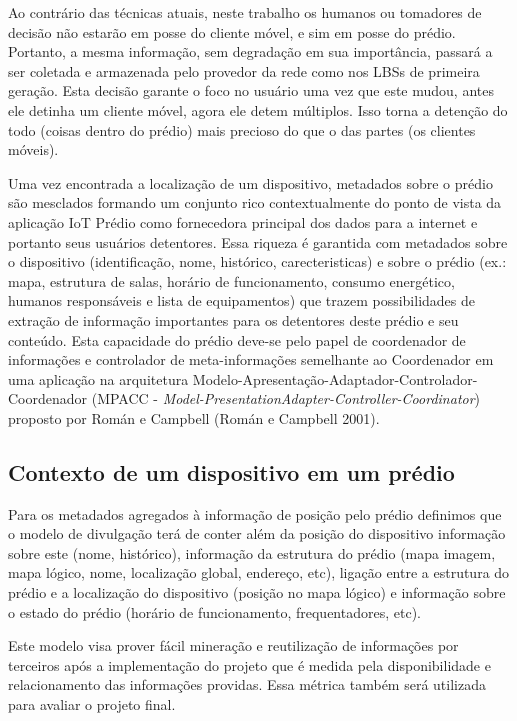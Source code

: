 Ao contrário das técnicas atuais, neste trabalho os humanos ou tomadores de decisão não estarão em posse do cliente móvel, e sim em posse do prédio. Portanto, a mesma informação, sem degradação em sua importância, passará a ser coletada e armazenada pelo provedor da rede como nos LBSs de primeira geração. Esta decisão garante o foco no usuário uma vez que este mudou, antes ele detinha um cliente móvel, agora ele detem múltiplos. Isso torna a detenção do todo (coisas dentro do prédio) mais precioso do que o das partes (os clientes móveis).

Uma vez encontrada a localização de um dispositivo, metadados sobre o prédio são mesclados formando um conjunto rico contextualmente do ponto de vista da aplicação IoT Prédio como fornecedora principal dos dados para a internet e portanto seus usuários detentores. Essa riqueza é garantida com metadados sobre o dispositivo (identificação, nome, histórico, carecteristicas) e sobre o prédio (ex.: mapa, estrutura de salas, horário de funcionamento, consumo energético, humanos responsáveis e lista de equipamentos) que trazem possibilidades de extração de informação importantes para os detentores deste prédio e seu conteúdo. Esta capacidade do prédio deve-se pelo papel de coordenador de informações e controlador de meta-informações semelhante ao Coordenador em uma aplicação na arquitetura Modelo-Apresentação-Adaptador-Controlador-Coordenador (MPACC - \textit{Model-PresentationAdapter-Controller-Coordinator}) proposto por Román e Campbell \cite{Roman2001} (Román e Campbell 2001).


\subsection{Contexto de um dispositivo em um prédio}
\label{subsec:Contexto de um dispositivo em um prédio}

Para os metadados agregados à informação de posição pelo prédio definimos que o modelo de divulgação terá de conter além da posição do dispositivo informação sobre este (nome, histórico), informação da estrutura do prédio (mapa imagem, mapa lógico, nome, localização global, endereço, etc), ligação entre a estrutura do prédio e a localização do dispositivo (posição no mapa lógico) e informação sobre o estado do prédio (horário de funcionamento, frequentadores, etc).


Este modelo visa prover fácil mineração e reutilização de informações por terceiros após a implementação do projeto que é medida pela disponibilidade e relacionamento das informações providas. Essa métrica também será utilizada para avaliar o projeto final.

